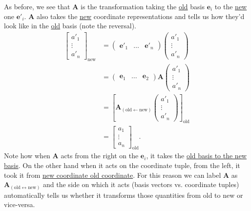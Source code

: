 \documentclass[../master.tex]{subfiles}
\begin{document}
	As before, we see that $\mathbf A$ is the transformation taking the \underline{old} basis $\mathbf e_i$ to the \underline{new} one $\mathbf e'_i$. $\mathbf A$ also takes the \underline{new} coordinate representations and tells us how they'd look like in the \underline{old} basis (note the reversal).
	\begin{equation*}
		\begin{aligned}
			\begin{bmatrix}
				a'_1\\
				\vdots\\
				a'_n
			\end{bmatrix}_{\mathrm{new}}
			&=
			\begin{pmatrix}
				\mathbf e'_1 & \dots & \mathbf e'_n
			\end{pmatrix}
			\begin{pmatrix}
				a'_1\\
				\vdots\\
				a'_n
			\end{pmatrix}\\
			&=
			\begin{pmatrix}
				\mathbf e_1 & \dots & \mathbf e_2
			\end{pmatrix} 
			\mathbf A
			\begin{pmatrix}
				a'_1\\
				\vdots\\
				a'_n
			\end{pmatrix}\\
			&=
			\left[\mathbf A_{(\mathrm{old} \leftarrow \mathrm{new})}
			\begin{pmatrix}
				a'_1\\
				\vdots\\
				a'_n
			\end{pmatrix}
			\right]_{\mathrm{old}}\\
			& = \begin{bmatrix}
				a_1\\
				\vdots\\
				a_n
			\end{bmatrix}_{\mathrm{old}}.
		\end{aligned}
	\end{equation*}
	Note how when $\mathbf A$ acts from the right on the $\mathbf e_i$, it takes the \ul{old basis to the new basis}. On the other hand when it acts on the coordinate tuple, from the left, it took it from \ul{new coordinate old coordinate}. For this reason we can label $\mathbf A$ as $\mathbf A_{(\mathrm{old} \leftrightarrow \mathrm{new})}$ and the side on which it acts (basis vectors vs. coordinate tuples) automatically tells us whether it transforms those quantities from old to new or vice-versa.
	
\end{document}
